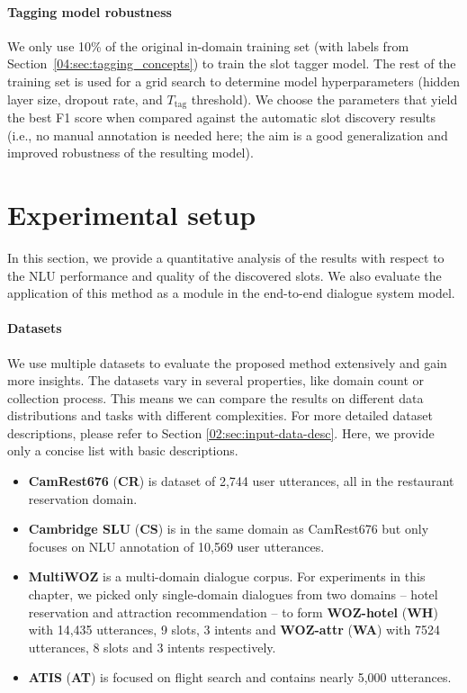 \paragraph{Tagging model robustness} 
We only use 10\% of the original in-domain training set (with labels from Section~\ref{04:sec:tagging_concepts}) to train the slot tagger model.
The rest of the training set is used for a grid search to determine model hyperparameters (hidden layer size, dropout rate, and $T_{\text{tag}}$ threshold). We choose the parameters that yield the best F1 score when compared against the automatic slot discovery results (i.e., no manual annotation is needed here; the aim is a good generalization and improved robustness of the resulting model).


\section{Experimental setup}
\label{04:sec:discovery_results}
In this section, we provide a quantitative analysis of the results with respect to the NLU performance and quality of the discovered slots.
We also evaluate the application of this method as a module in the end-to-end dialogue system model.
\paragraph{Datasets}
We use multiple datasets to evaluate the proposed method extensively and gain more insights.
The datasets vary in several properties, like domain count or collection process.
This means we can compare the results on different data distributions and tasks with different complexities.
For more detailed dataset descriptions, please refer to Section \ref{02:sec:input-data-desc}.
Here, we provide only a concise list with basic descriptions.
\begin{itemize}
    \item \textbf{CamRest676} (\textbf{CR}) is dataset of 2,744 user utterances, all in the restaurant reservation domain.
    \item \textbf{Cambridge SLU} (\textbf{CS}) is in the same domain as CamRest676 but only focuses on NLU annotation of  10,569 user utterances.
    \item \textbf{MultiWOZ} is a multi-domain dialogue corpus. For experiments in this chapter, we picked only single-domain dialogues from two domains -- hotel reservation and attraction recommendation -- to form \textbf{WOZ-hotel} (\textbf{WH}) with 14,435 utterances, 9 slots, 3 intents and \textbf{WOZ-attr} (\textbf{WA}) with 7524 utterances, 8 slots and 3 intents respectively.
    \item \textbf{ATIS} (\textbf{AT}) is focused on flight search and contains nearly 5,000 utterances.
\end{itemize}
